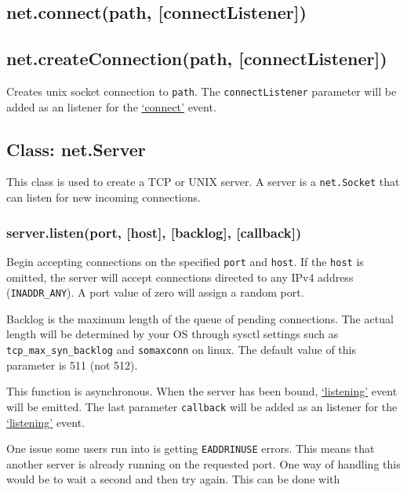 \subsection{net.connect(path, {[}connectListener{]})}

\subsection{net.createConnection(path, {[}connectListener{]})}

Creates unix socket connection to \texttt{path}. The
\texttt{connectListener} parameter will be added as an listener for the
\hyperref[net_event_connect]{`connect'} event.

\subsection{Class: net.Server}

This class is used to create a TCP or UNIX server. A server is a
\texttt{net.Socket} that can listen for new incoming connections.

\subsubsection{server.listen(port, {[}host{]}, {[}backlog{]},
{[}callback{]})}

Begin accepting connections on the specified \texttt{port} and
\texttt{host}. If the \texttt{host} is omitted, the server will accept
connections directed to any IPv4 address (\texttt{INADDR\_ANY}). A port
value of zero will assign a random port.

Backlog is the maximum length of the queue of pending connections. The
actual length will be determined by your OS through sysctl settings such
as \texttt{tcp\_max\_syn\_backlog} and \texttt{somaxconn} on linux. The
default value of this parameter is 511 (not 512).

This function is asynchronous. When the server has been bound,
\hyperref[net_event_listening]{`listening'} event will be emitted. The
last parameter \texttt{callback} will be added as an listener for the
\hyperref[net_event_listening]{`listening'} event.

One issue some users run into is getting \texttt{EADDRINUSE} errors.
This means that another server is already running on the requested port.
One way of handling this would be to wait a second and then try again.
This can be done with

